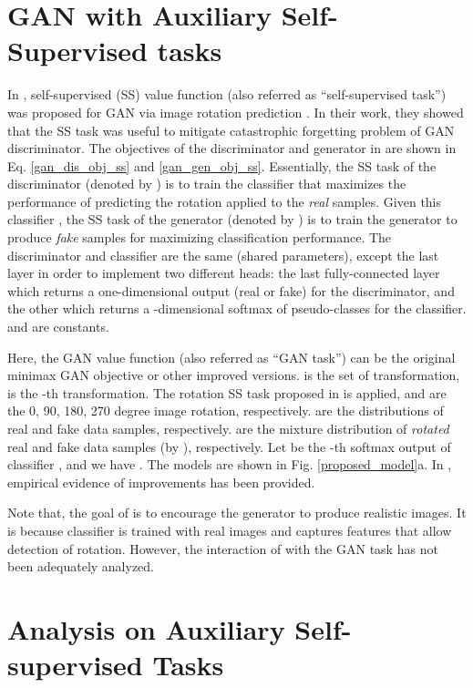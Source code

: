 \documentclass{article}
\begin{document}
 
\section{GAN with Auxiliary Self-Supervised tasks}

In \cite{chen-arxiv-2018}, self-supervised (SS) value function (also referred as ``self-supervised task'') was proposed for GAN \cite{goodfellow-nisp-2014} via image rotation prediction \cite{gidaris-iclr-2018}. 
In their work, they showed that the SS task was useful to mitigate catastrophic forgetting problem of GAN discriminator. The objectives of the discriminator and generator in \cite{chen-arxiv-2018} are shown in Eq. \ref{gan_dis_obj_ss} and \ref{gan_gen_obj_ss}. Essentially, the SS task of the discriminator (denoted by ) is to train the classifier  that maximizes the performance of predicting 
the rotation applied to the {\em real} samples.
Given this classifier , 
the SS task of the generator (denoted by ) is to train the generator  to produce {\em fake} samples for maximizing classification performance. The discriminator and classifier are the same (shared parameters), except the last layer in order to implement  two different heads: the last fully-connected layer which returns a one-dimensional output (real or fake) for the discriminator,  and the other which returns a -dimensional softmax of pseudo-classes for the classifier.  and  are constants.


Here, the GAN value function  
(also referred as ``GAN task'')
can be the original minimax GAN objective \cite{goodfellow-nisp-2014} or other improved versions.
 is the set of transformation,  is the -th transformation.
The rotation SS task proposed in \cite{gidaris-iclr-2018} is applied, and  are the 0, 90, 180, 270 degree image rotation, respectively.
 are the distributions of real and fake data samples, respectively.
 are the mixture distribution of {\em rotated} real and fake data samples (by ), respectively.
Let  be the -th softmax output of classifier , and we have . The models are shown in Fig. \ref{proposed_model}a. In \cite{chen-arxiv-2018}, empirical evidence of improvements has been provided.

Note that, the goal of  is to encourage the generator to produce realistic images. It is because classifier  is trained with real images and captures features that allow detection of rotation. However, the interaction of  with the GAN task  has not been adequately analyzed. 



 
\section{Analysis on Auxiliary Self-supervised Tasks}
\label{analysis_on_auxiliary_ss}
\end{document}
